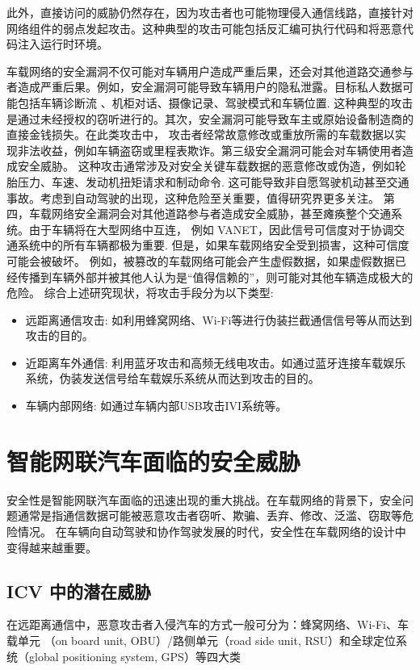 此外，直接访问的威胁仍然存在，因为攻击者也可能物理侵入通信线路，直接针对网络组件的弱点发起攻击。这种典型的攻击可能包括反汇编可执行代码和将恶意代码注入运行时环境。

车载网络的安全漏洞不仅可能对车辆用户造成严重后果，还会对其他道路交通参与者造成严重后果。例如，安全漏洞可能导致车辆用户的隐私泄露。目标私人数据可能包括车辆诊断流
、机柜对话、摄像记录、驾驶模式和车辆位置\cite{amoozadeh2015security}. 
这种典型的攻击是通过未经授权的窃听进行的。其次，安全漏洞可能导致车主或原始设备制造商的直接金钱损失。在此类攻击中，
攻击者经常故意修改或重放所需的车载数据以实现非法收益，例如车辆盗窃或里程表欺诈。第三级安全漏洞可能会对车辆使用者造成安全威胁。
这种攻击通常涉及对安全关键车载数据的恶意修改或伪造，例如轮胎压力、车速、发动机扭矩请求和制动命令. 
这可能导致非自愿驾驶机动甚至交通事故。考虑到自动驾驶的出现，这种危险至关重要，值得研究界更多关注。
第四，车载网络安全漏洞会对其他道路参与者造成安全威胁，甚至瘫痪整个交通系统。由于车辆将在大型网络中互连，
例如 VANET，因此信号可信度对于协调交通系统中的所有车辆都极为重要\cite{harding2014vehicle}.
 但是，如果车载网络安全受到损害，这种可信度可能会被破坏。
 例如，被篡改的车载网络可能会产生虚假数据，如果虚假数据已经传播到车辆外部并被其他人认为是“值得信赖的”，则可能对其他车辆造成极大的危险。
综合上述研究现状，将攻击手段分为以下类型:
\begin{itemize}
    \item 远距离通信攻击: 如利用蜂窝网络、Wi-Fi等进行伪装拦截通信信号等从而达到攻击的目的。
    \item 近距离车外通信: 利用蓝牙攻击和高频无线电攻击。如通过蓝牙连接车载娱乐系统，伪装发送信号给车载娱乐系统从而达到攻击的目的。
    \item 车辆内部网络: 如通过车辆内部USB攻击IVI系统等。
\end{itemize}

\section{智能网联汽车面临的安全威胁}
安全性是智能网联汽车面临的迅速出现的重大挑战。在车载网络的背景下，安全问题通常是指通信数据可能被恶意攻击者窃听、欺骗、丢弃、修改、泛滥、窃取等危险情况。
在车辆向自动驾驶和协作驾驶发展的时代，安全性在车载网络的设计中变得越来越重要。

\subsection{ICV 中的潜在威胁}
在远距离通信中，恶意攻击者入侵汽车的方式一般可分为：蜂窝网络、Wi-Fi、车载单元
（on board unit, OBU）/路侧单元（road side
unit, RSU）和全球定位系统（global positioning
system, GPS）等四大类

